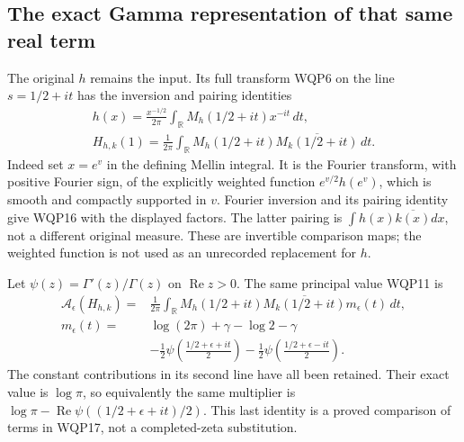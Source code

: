 \subsection{The exact Gamma representation of that same real term}

The original $h$ remains the input. Its full transform WQP6 on
the line $s=1/2+it$ has the inversion and pairing identities
\begin{equation}\tag{WQP16}
 \begin{gathered}
 h(x)=\frac{x^{-1/2}}{2\pi}\int_{\mathbb R}
                   M_h(1/2+it)x^{-it}\,dt,\\
 H_{h,k}(1)=\frac1{2\pi}\int_{\mathbb R}
                M_h(1/2+it)\overline{M_k(1/2+it)}\,dt .
 \end{gathered}
\end{equation}
Indeed set $x=e^v$ in the defining Mellin integral. It is the
Fourier transform, with positive Fourier sign, of the explicitly
weighted function $e^{v/2}h(e^v)$, which is smooth and compactly
supported in $v$. Fourier inversion and its pairing identity
give WQP16 with the displayed factors. The latter pairing is
$\int h(x)\overline{k(x)}dx$, not a different original measure.
These are invertible comparison maps; the weighted function
is not used as an unrecorded replacement for $h$.

Let $\psi(z)=\Gamma'(z)/\Gamma(z)$ on $\operatorname{Re}z>0$.
The same principal value WQP11 is
\begin{equation}\tag{WQP17}
 \begin{split}
 \mathcal A_\epsilon(H_{h,k})={}&\frac1{2\pi}
  \int_{\mathbb R}M_h(1/2+it)\overline{M_k(1/2+it)}
          m_\epsilon(t)\,dt,\\
 m_\epsilon(t)={}&
 \log(2\pi)+\gamma-\log2-\gamma\\
 &-\frac12\psi\left(\frac{1/2+\epsilon+it}{2}\right)
  -\frac12\psi\left(\frac{1/2+\epsilon-it}{2}\right).
 \end{split}
\end{equation}
The constant contributions in its second line have all been
retained. Their exact value is $\log\pi$, so equivalently the
same multiplier is
$\log\pi-\operatorname{Re}\psi((1/2+\epsilon+it)/2)$.
This last identity is a proved comparison of terms in WQP17,
not a completed-zeta substitution.

